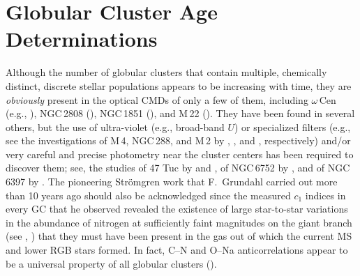 \documentclass[12pt,preprint]{aastex}
\begin{document}
\section{Globular Cluster Age Determinations}
\label{sec:ages}

Although the number of globular clusters that contain multiple, chemically
distinct, discrete stellar populations appears to be increasing with time,
they are {\it obviously} present in the optical CMDs of only a few of them,
including $\omega\,$Cen (e.g., \citealt{bbp10}), NGC$\,$2808 (\citealt{pba07}),
NGC$\,$1851 (\citealt{mbp08}), and M$\,$22 (\citealt{mmp09}).  They have been
found in several others, but the use of ultra-violet (e.g., broad-band $U$) or
specialized filters (e.g., see the investigations of M$\,$4, NGC$\,$288, and
M$\,$2 by \citealt{mvp08}, \citealt{rlj11}, and \citealt{lpm12}, respectively)
and/or very careful and precise photometry near the cluster centers has been
required to discover them; see, the studies of 47 Tuc by \citet{apk09} and
\citet{mpb12}, of NGC$\,$6752 by \citet{mpk10}, and of NGC$\,$6397 by
\citet{mmp12}.  The pioneering Str\"omgren work that F.~Grundahl carried out
more than 10 years ago should also be acknowledged since the measured $c_1$
indices in every GC that he observed revealed the existence of large
star-to-star variations in the abundance of nitrogen at sufficiently faint
magnitudes on the giant branch (see \citealt{gvb00}, \citealt{gb01}) that
they must have been present in the gas out of which the current MS and lower
RGB stars formed.  In fact, C--N and O--Na anticorrelations appear to be a
universal property of all globular clusters (\citealt{cbg10b}).
\end{document}
